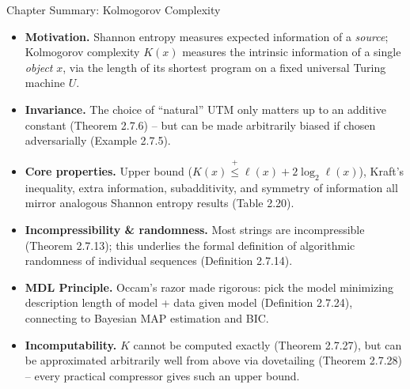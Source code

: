 \documentclass[aspectratio=169,10pt]{beamer}
\begin{document}
\begin{frame}{Chapter Summary: Kolmogorov Complexity}
  \begin{itemize}
    \item \textbf{Motivation.} Shannon entropy measures expected
      information of a \emph{source}; Kolmogorov complexity $K(x)$
      measures the intrinsic information of a single \emph{object} $x$,
      via the length of its shortest program on a fixed universal Turing
      machine $U$.
    \item \textbf{Invariance.} The choice of ``natural'' UTM only matters
      up to an additive constant (Theorem 2.7.6) -- but can be made
      arbitrarily biased if chosen adversarially (Example 2.7.5).
    \item \textbf{Core properties.} Upper bound
      ($K(x)\overset{+}{\le}\ell(x)+2\log_2\ell(x)$), Kraft's inequality,
      extra information, subadditivity, and symmetry of information all
      mirror analogous Shannon entropy results (Table 2.20).
    \item \textbf{Incompressibility \& randomness.} Most strings are
      incompressible (Theorem 2.7.13); this underlies the formal
      definition of algorithmic randomness of individual sequences
      (Definition 2.7.14).
    \item \textbf{MDL Principle.} Occam's razor made rigorous: pick the
      model minimizing description length of model + data given model
      (Definition 2.7.24), connecting to Bayesian MAP estimation and BIC.
    \item \textbf{Incomputability.} $K$ cannot be computed exactly
      (Theorem 2.7.27), but can be approximated arbitrarily well from
      above via dovetailing (Theorem 2.7.28) -- every practical compressor
      gives such an upper bound.
  \end{itemize}
\end{frame}
\end{document}
